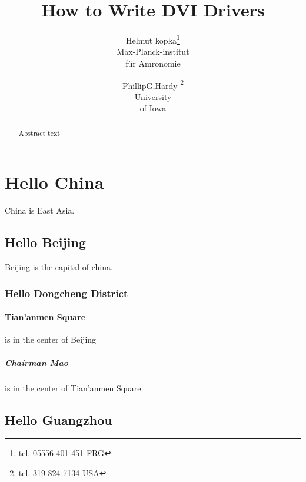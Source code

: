 \documentclass[12pt,twoside,twocolumn,a4paper]{article}   %
\begin{document}
	\title{How to Write DVI Drivers}
	\author{Helmut kopka\thanks{tel. %
		05556-401-451 FRG}\\ %
		Max-Planck-institut\\
		f\"ur Amronomie
		\and %
		PhillipG,Hardy
		\thanks{tel.
		319-824-7134 USA}\\
		University\\of Iowa}
	\maketitle %
	\begin{abstract}
  	Abstract text
	\end{abstract} %
	\setcounter{tocdepth}{3} %
	\tableofcontents %
	\listoffigures
	\listoftables
	\section{Hello China} China is East Asia.
		\subsection{Hello Beijing} Beijing is the capital of china.
			\subsubsection{Hello Dongcheng District}
				\paragraph{Tian'anmen Square} is in the center of Beijing
					\subparagraph{Chairman Mao} is in the center of Tian'anmen Square
			\subsection{Hello Guangzhou}
\end{document}
